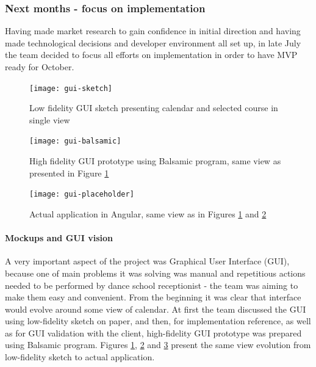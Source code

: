 \documentclass{article}
\begin{document}
\subsubsection{Next months - focus on implementation}
Having made market research to gain confidence in initial direction and having made technological decisions and developer environment all set up, in late July the team decided to focus all efforts on implementation in order to have MVP ready for October.

\begin{figure}[h]
    \texttt{[image: gui-sketch]}
    \caption{Low fidelity GUI sketch presenting calendar and selected course in single view}
    \label{fig:gui-sketch}
\end{figure}
\begin{figure}[h]
    \texttt{[image: gui-balsamic]}
    \caption{High fidelity GUI prototype using Balsamic program, same view as presented in Figure \ref{fig:gui-sketch}}
    \label{fig:gui-balsamic}
\end{figure}
\begin{figure}[h]
    \texttt{[image: gui-placeholder]}
    \caption{Actual application in Angular, same view as in Figures \ref{fig:gui-sketch} and \ref{fig:gui-balsamic}}
    \label{fig:gui-angular}
\end{figure}

\paragraph{Mockups and GUI vision}
A very important aspect of the project was Graphical User Interface (GUI), because one of main problems it was solving was manual and repetitious actions needed to be performed by dance school receptionist - the team was aiming to make them easy and convenient. From the beginning it was clear that interface would evolve around some view of calendar. At first the team discussed the GUI using low-fidelity sketch on paper, and then, for implementation reference, as well as for GUI validation with the client, high-fidelity GUI prototype was prepared using Balsamic program. Figures \ref{fig:gui-sketch}, \ref{fig:gui-balsamic} and \ref{fig:gui-angular} present the same view evolution from low-fidelity sketch to actual application.
\end{document}
